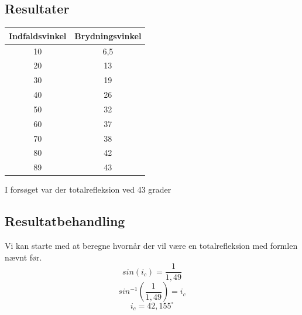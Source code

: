 \subsection{Resultater}
\begin{table}[h]
    \centering
    \begin{tabular}{|c|c|}
        \hline
        Indfaldsvinkel & Brydningsvinkel\\
        \hline
        10 & 6,5\\
        \hline
        20 & 13\\
        \hline
        30 & 19\\
        \hline
        40 & 26\\
        \hline
        50 & 32\\
        \hline
        60 & 37\\
        \hline
        70 & 38\\
        \hline
        80 & 42\\
        \hline
        89 & 43\\
        \hline
    \end{tabular}
\end{table}

I forsøget var der totalrefleksion ved 43 grader

\subsection{Resultatbehandling}
Vi kan starte med at beregne hvornår der vil være en totalrefleksion med formlen nævnt før.
\begin{equation*}
    sin(i_{c}) = \frac{1}{1,49}
\end{equation*}
\begin{equation*}
    sin^{-1}(\frac{1}{1,49}) = i_{c}
\end{equation*}
\begin{equation*}
    i_{c} = 42,155^{\circ}
\end{equation*}

